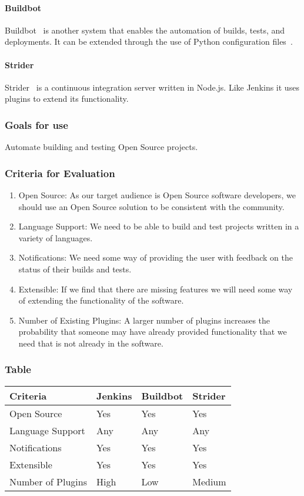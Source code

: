 \documentclass[10pt,letterpaper,onecolumn,draftclsnofoot]{IEEEtran}
\begin{document}
\paragraph{Buildbot}
Buildbot~\cite{buildbotmain} is another system that enables the automation of builds, tests, and deployments.
It can be extended through the use of Python configuration files~\cite{buildbotconfig}. 
\paragraph{Strider}
Strider~\cite{stridermain} is a continuous integration server written in Node.js.
Like Jenkins it uses plugins to extend its functionality.
\subsubsection{Goals for use}
Automate building and testing Open Source projects.
\subsubsection{Criteria for Evaluation}
\begin{enumerate}
  \item Open Source: As our target audience is Open Source software developers, we should use an Open Source solution to be consistent with the community.
  \item Language Support: We need to be able to build and test projects written in a variety of languages.
  \item Notifications: We need some way of providing the user with feedback on the status of their builds and tests.
  \item Extensible: If we find that there are missing features we will need some way of extending the functionality of the software.
  \item Number of Existing Plugins: A larger number of plugins increases the probability that someone may have already provided functionality that we need that is not already in the software.
\end{enumerate}
\subsubsection{Table}
\begin{center}
  \begin{tabular}{llll}
    Criteria & Jenkins & Buildbot & Strider \\ \midrule
    Open Source       & Yes & Yes & Yes \\ \midrule
    Language Support  & Any & Any & Any \\ \midrule
    Notifications     & Yes & Yes & Yes \\ \midrule
    Extensible        & Yes & Yes & Yes \\ \midrule
    Number of Plugins & High & Low & Medium \\ \bottomrule
  \end{tabular}
\end{center}
\end{document}
